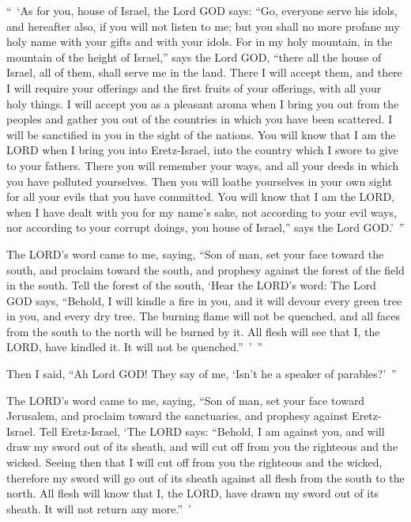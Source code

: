 \myverse{}“ ‘As for you, house of Israel, the Lord GOD says: “Go, everyone
serve his idols, and hereafter also, if you will not listen to me; but you shall no more profane my holy
name with your gifts and with your idols.
\myverse{}For in my holy mountain, in the mountain of the height of Israel,” says the
Lord GOD, “there all the house of Israel, all of them, shall serve me in the land. There I will accept
them, and there I will require your offerings and the first fruits of your offerings, with all your holy
things.
\myverse{}I will accept you as a pleasant aroma when I bring you out from the peoples
and gather you out of the countries in which you have been scattered. I will be sanctified in you in the
sight of the nations.
\myverse{}You will know that I am the LORD when I bring you into Eretz-Israel, into
the country which I swore to give to your fathers.
\myverse{}There you will remember your ways, and all your deeds in which you have polluted
yourselves. Then you will loathe yourselves in your own sight for all your evils that you have committed.
\myverse{}You will know that I am the LORD, when I have dealt with you for my name’s
sake, not according to your evil ways, nor according to your corrupt doings, you house of Israel,” says
the Lord GOD.’ ”

\myverse{}The LORD’s word came to me, saying,
\myverse{}“Son of man, set your face toward the south, and proclaim toward the south,
and prophesy against the forest of the field in the south.
\myverse{}Tell the forest of the south, ‘Hear the LORD’s word: The Lord GOD says, “Behold,
I will kindle a fire in you, and it will devour every green tree in you, and every dry tree. The burning
flame will not be quenched, and all faces from the south to the north will be burned by it.
\myverse{}All flesh will see that I, the LORD, have kindled it. It will not be quenched.” ’ ”

\myverse{}Then I said, “Ah Lord GOD! They say of me, ‘Isn’t he a speaker
of parables?’ ”


\mychapter{} \myverse*{}The LORD’s word came to me, saying,
\myverse{}“Son of man, set your face toward Jerusalem, and proclaim toward the sanctuaries,
and prophesy against Eretz-Israel.
\myverse{}Tell Eretz-Israel, ‘The LORD says: “Behold, I am against you, and will draw
my sword out of its sheath, and will cut off from you the righteous and the wicked.
\myverse{}Seeing then that I will cut off from you the righteous and the wicked, therefore
my sword will go out of its sheath against all flesh from the south to the north.
\myverse{}All flesh will know that I, the LORD, have drawn my sword out of its sheath.
It will not return any more.” ’

